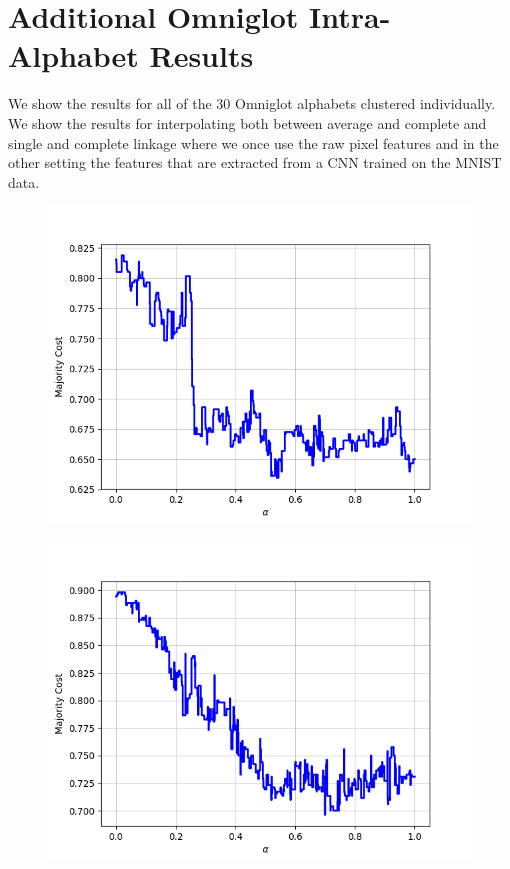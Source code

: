 \chapter{Additional Omniglot Intra-Alphabet Results}
\label{app:omniglot}

We show the results for all of the 30 Omniglot alphabets clustered individually. We show the results for interpolating both between average and complete and single and complete linkage where we once use the raw pixel features and in the other setting the features that are extracted from a CNN trained on the MNIST data.

\begin{figure}[H]
\centering
\begin{minipage}{.24\textwidth}
  \centering
  {\includegraphics[width=\linewidth]{plots/omniglot-intra-ac/Alphabet_of_the_Magi}}
\end{minipage}
\begin{minipage}{.24\textwidth}
  \centering
  {\includegraphics[width=\linewidth]{plots/omniglot-intra-ac/Anglo-Saxon_Futhorc}}

\end{minipage}
\end{figure}
